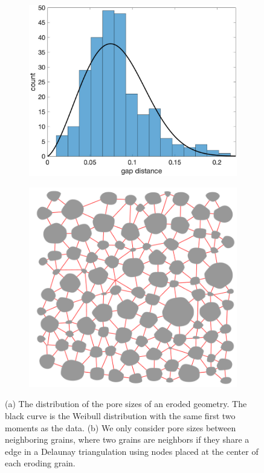 \documentclass[preprint,10pt]{elsarticle}
\begin{document}
\begin{figure}[H]
\begin{subfigure}[b]{0.5\textwidth}
\includegraphics*[height = 0.8\linewidth]{./figs/gap_hist100b100}
\caption{}
\end{subfigure}
\begin{subfigure}[b]{0.5\textwidth}
\includegraphics*[height =0.8\linewidth]{./figs/triangulation_100b100}
\caption{}
\end{subfigure}
\caption{\label{fig:Eroding100gap} (a) The distribution of the pore
sizes of an eroded geometry. The black curve is the Weibull distribution
with the same first two moments as the data. (b) We only consider pore
sizes between neighboring grains, where two grains are neighbors if they
share a edge in a Delaunay triangulation using nodes placed at the
center of each eroding grain.}
\end{figure}
\end{document}
